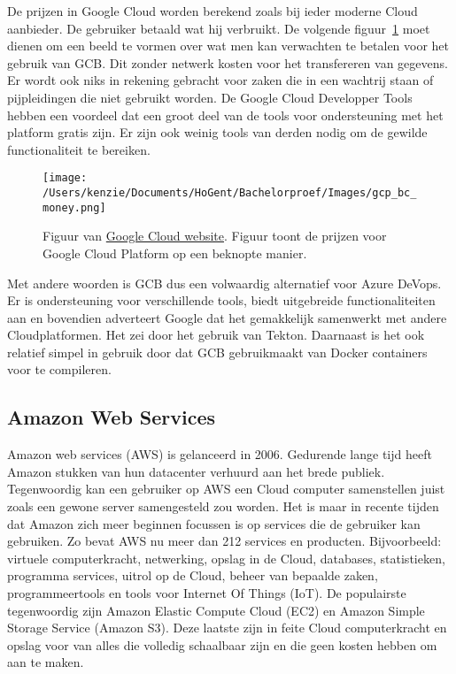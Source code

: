 De prijzen in Google Cloud worden berekend zoals bij ieder moderne Cloud aanbieder. De gebruiker betaald wat hij verbruikt. De volgende figuur~\ref{fig:GCP_BC_money} moet dienen om een beeld te vormen over wat men kan verwachten te betalen voor het gebruik van GCB. Dit zonder netwerk kosten voor het transfereren van gegevens. Er wordt ook niks in rekening gebracht voor zaken die in een wachtrij staan of pijpleidingen die niet gebruikt worden. De Google Cloud Developper Tools hebben een voordeel dat een groot deel van de tools voor ondersteuning met het platform gratis zijn. Er zijn ook weinig tools van derden nodig om de gewilde functionaliteit te bereiken.

\begin{figure}[!htbp]
    \centering
    \texttt{[image: /Users/kenzie/Documents/HoGent/Bachelorproef/Images/gcp\_bc\_money.png]}
    \caption{Figuur van \href{https://cloud.google.com/cloud-build/pricing}{Google Cloud website}. Figuur toont de prijzen voor Google Cloud Platform op een beknopte manier.}
    \label{fig:GCP_BC_money}
\end{figure}

Met andere woorden is GCB dus een volwaardig alternatief voor Azure DeVops. Er is ondersteuning voor verschillende tools, biedt uitgebreide functionaliteiten aan en bovendien adverteert Google dat het gemakkelijk samenwerkt met andere Cloudplatformen. Het zei door het gebruik van Tekton. Daarnaast is het ook relatief simpel in gebruik door dat GCB gebruikmaakt van Docker containers voor te compileren.

\subsection{Amazon Web Services}
Amazon web services (AWS) is gelanceerd in 2006. Gedurende lange tijd heeft Amazon stukken van hun datacenter verhuurd aan het brede publiek. Tegenwoordig kan een gebruiker op AWS een Cloud computer samenstellen juist zoals een gewone server samengesteld zou worden. Het is maar in recente tijden dat Amazon zich meer beginnen focussen is op services die de gebruiker kan gebruiken. Zo bevat AWS nu meer dan 212 services en producten. Bijvoorbeeld: virtuele computerkracht, netwerking, opslag in de Cloud, databases, statistieken, programma services, uitrol op de Cloud, beheer van bepaalde zaken, programmeertools en tools voor Internet Of Things (IoT). De populairste tegenwoordig zijn Amazon Elastic Compute Cloud (EC2) en Amazon Simple Storage Service (Amazon S3). Deze laatste zijn in feite Cloud computerkracht en opslag voor van alles die volledig schaalbaar zijn en die geen kosten hebben om aan te maken.

